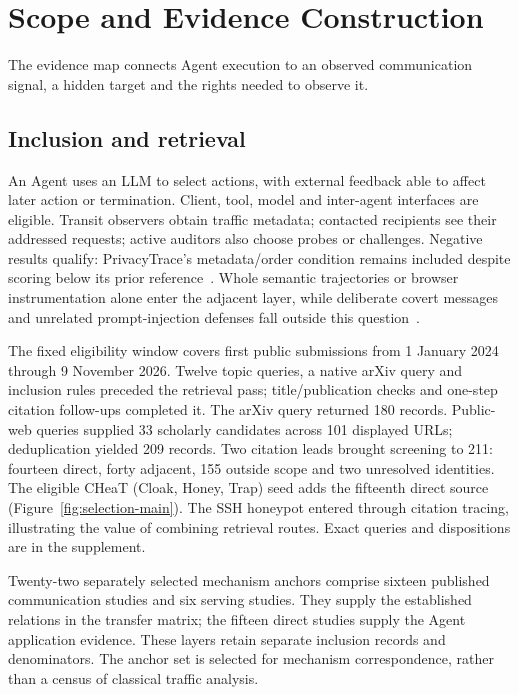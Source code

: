 \section{Scope and Evidence Construction}\label{sec:scope}
The evidence map connects Agent execution to an observed communication signal, a hidden target and the rights needed to observe it.

\subsection{Inclusion and retrieval}
An Agent uses an LLM to select actions, with external feedback able to affect later action or termination. Client, tool, model and inter-agent interfaces are eligible. Transit observers obtain traffic metadata; contacted recipients see their addressed requests; active auditors also choose probes or challenges. Negative results qualify: PrivacyTrace's metadata/order condition remains included despite scoring below its prior reference~\cite{duan2026privacytrace}. Whole semantic trajectories or browser instrumentation alone enter the adjacent layer, while deliberate covert messages and unrelated prompt-injection defenses fall outside this question~\cite{yao2026intentminer,uitraces2026}.

The fixed eligibility window covers first public submissions from 1 January 2024 through 9 November 2026. Twelve topic queries, a native arXiv query and inclusion rules preceded the retrieval pass; title/publication checks and one-step citation follow-ups completed it. The arXiv query returned 180 records. Public-web queries supplied 33 scholarly candidates across 101 displayed URLs; deduplication yielded 209 records. Two citation leads brought screening to 211: fourteen direct, forty adjacent, 155 outside scope and two unresolved identities. The eligible CHeaT (Cloak, Honey, Trap) seed adds the fifteenth direct source (Figure~\ref{fig:selection-main}). The SSH honeypot entered through citation tracing, illustrating the value of combining retrieval routes. Exact queries and dispositions are in the supplement.


Twenty-two separately selected mechanism anchors comprise sixteen published communication studies and six serving studies. They supply the established relations in the transfer matrix; the fifteen direct studies supply the Agent application evidence. These layers retain separate inclusion records and denominators. The anchor set is selected for mechanism correspondence, rather than a census of classical traffic analysis.


